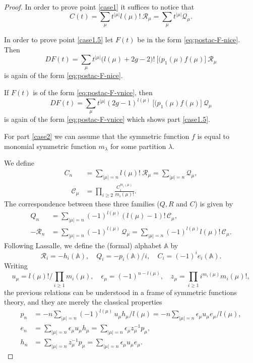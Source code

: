 \documentclass[12pt]{amsart}
\theoremstyle{plain}
\theoremstyle{remark}
\newcommand{\A}{\mathbb{A}}
\begin{document}
\begin{proof}
In order to prove point \ref{case1} it suffices to notice that
$$C(t)=\sum_{\mu}  t^{|\mu|} l(\mu)!\ 
\mathcal{R}_\mu = \sum_{\mu}  t^{|\mu|}\mathcal{Q}_\mu.$$

In order to prove point \ref{case1.5} let $F(t)$ be in the form
\eqref{eq:postac-F-nice}. Then
$$
DF(t)=\sum_{\mu}  t^{|\mu|}
\big(l(\mu) + 2g - 2\big)!\ \big[ (p_1(\mu) f(\mu)\big] \
\mathcal{R}_\mu
$$
is again of the form \eqref{eq:postac-F-nice}.

If $F(t)$ is of the form \eqref{eq:postac-F-vnice}, then
$$
DF(t)=\sum_{\mu}  t^{|\mu|}
(2g-1)^{l(\mu)}\ \big[ (p_1(\mu) f(\mu)\big] \
\mathcal{Q}_\mu
$$
is again of the form \eqref{eq:postac-F-vnice} which shows part \ref{case1.5}.


For part \ref{case2} we can
assume that the symmetric function $f$ is
equal to monomial symmetric function $m_{\lambda}$ for some partition
$\lambda$.

We define
\begin{align*} C_n & = \sum_{|\mu|=n} l(\mu)!\ \mathcal{R}_\mu = \sum_{|\mu|=n}
\mathcal{Q}_\mu, \\
\quad
\mathcal{C}_\mu & =\prod_{i \ge 2} \frac{C_i^{m_i(\mu)}}{m_i(\mu)!}.
\end{align*}
The correspondence between these three families ($Q, R$ and $C$) is given by
\begin{equation*}
\begin{split}
Q_n&= \sum_{|\mu|=n} {(-1)}^{l(\mu)} (l(\mu)-1)!  \,  \mathcal{C}_\mu,\\
-\mathcal{R}_n&=\sum_{|\mu|=n} {(-1)}^{l(\mu)} \,  \mathcal{Q}_\mu=
\sum_{|\mu|=n} {(-1)}^{l(\mu)} l(\mu)!\,  \mathcal{C}_\mu.
\end{split}
\end{equation*}  
Following Lassalle, \cite{Lassalle-preprint2007} we define the
(formal) alphabet
$\A$ by
$$ \mathcal{R}_i = - h_i(\A), \quad Q_i = - p_i(\A) / i, \quad
C_i = (-1)^{i} e_i(\A).$$
Writing
$$ u_{\mu} = l(\mu)! / \prod_{i \geq 1} m_i(\mu), \quad \epsilon_{\mu} =
(-1)^{n - l(\mu)}, \quad z_{\mu} = \prod_{i \geq 1} i^{m_i(\mu)}m_i(\mu)!, $$
the previous relations can be understood in a frame of symmetric functions
theory, and they are merely the classical properties~\cite[pp.~25 and
33]{Macdonald1995}
\begin{equation*}
\begin{split}
p_n&=-n \sum_{|\mu|=n} {(-1)}^{l(\mu)} \,  u_\mu h_\mu/l(\mu)
=-n \sum_{|\mu|=n} \epsilon_\mu  u_\mu e_\mu/ l(\mu),\\
e_n&= \sum_{|\mu|=n} \epsilon_\mu u_\mu h_\mu= \sum_{|\mu|=n} \epsilon_\mu
z_{\mu}^{-1} p_{\mu},\\
h_n&=\sum_{|\mu|=n} z_{\mu}^{-1} p_{\mu}=
\sum_{|\mu|=n} \epsilon_\mu u_\mu e_\mu.
\end{split}
\end{equation*}



\end{proof}
\end{document}
